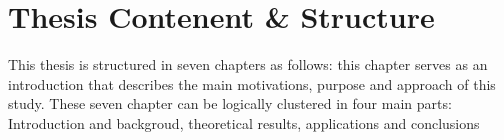


\section{Thesis Contenent \& Structure}
This thesis is structured in seven chapters as follows: this chapter serves as an introduction that describes the main motivations, purpose and approach of this study.
These seven chapter can be logically clustered in four main parts: Introduction and backgroud, theoretical results, applications and conclusions  
%
\newline


